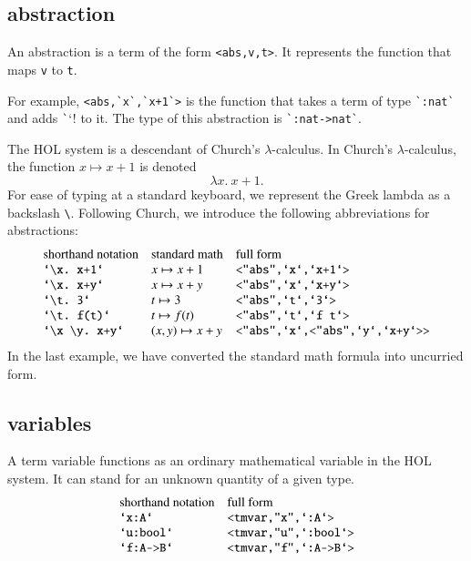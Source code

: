 \documentclass[cup9a]{cupbook}
\begin{document}
\subsection{abstraction}

An abstraction is a term of the form \verb!<abs,v,t>!.  It
represents the function that maps \verb!v! to \verb!t!.

For example, \verb!<abs,`x`,`x+1`>! is the function that
takes a term of type \verb!`:nat`! and adds \verb!`!`! to
it.  The type of this abstraction is \verb!`:nat->nat`!.

The HOL system is a descendant of Church's $\lambda$-calculus.
In Church's $\lambda$-calculus, the function $x\mapsto x+1$
is denoted
$$
\lambda x.~x+1.
$$
For ease of typing at a standard keyboard, we represent the Greek lambda as a backslash \verb!\!.
Following Church, we introduce the following abbreviations
for abstractions:
$$
\begin{array}{lll}
\hbox{shorthand notation}&\hbox{standard math}&\hbox{full form}\\
\verb!`\x. x+1`!&x\mapsto x+1&\verb!<"abs",`x`,`x+1`>!\\
\verb!`\x. x+y`!&x\mapsto x+y&\verb!<"abs",`x`,`x+y`>!\\
\verb!`\t. 3`!&t\mapsto 3&\verb!<"abs",`t`,`3`>!\\
\verb!`\t. f(t)`!&t\mapsto f(t)&\verb!<"abs",`t`,`f t`>!\\
\verb!`\x \y. x+y`!&(x,y)\mapsto x+y&\verb!<"abs",`x`,<"abs",`y`,`x+y`>>!\\
\end{array}
$$
In the last example, we have converted the standard math formula into uncurried form.

\subsection{variables}

A term variable functions as an ordinary mathematical variable in the HOL system.  It can stand for an unknown quantity of a given type.
$$
\begin{array}{lll}
\hbox{shorthand notation}&\hbox{full form}\\
\verb!`x:A`!&\verb!<tmvar,"x",`:A`>!\\
\verb!`u:bool`!&\verb!<tmvar,"u",`:bool`>!\\
\verb!`f:A->B`!&\verb!<tmvar,"f",`:A->B`>!\\
\end{array}
$$
\end{document}
